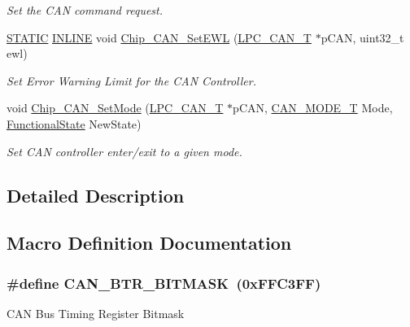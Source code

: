 \begin{DoxyCompactItemize}
\begin{DoxyCompactList}\small\item\em Set the C\+AN command request. \end{DoxyCompactList}\item 
\hyperlink{group__LPC__Types__Public__Macros_ga10b2d890d871e1489bb02b7e70d9bdfb}{S\+T\+A\+T\+IC} \hyperlink{group__LPC__Types__Public__Types_ga2eb6f9e0395b47b8d5e3eeae4fe0c116}{I\+N\+L\+I\+NE} void \hyperlink{group__CAN__17XX__40XX_ga70f13e4a2f4cd74d56e14b0c6343c8df}{Chip\+\_\+\+C\+A\+N\+\_\+\+Set\+E\+WL} (\hyperlink{structLPC__CAN__T}{L\+P\+C\+\_\+\+C\+A\+N\+\_\+T} $\ast$p\+C\+AN, uint32\+\_\+t ewl)
\begin{DoxyCompactList}\small\item\em Set Error Warning Limit for the C\+AN Controller. \end{DoxyCompactList}\item 
void \hyperlink{group__CAN__17XX__40XX_gad935e9c3c93278bb18b99df67ba52516}{Chip\+\_\+\+C\+A\+N\+\_\+\+Set\+Mode} (\hyperlink{structLPC__CAN__T}{L\+P\+C\+\_\+\+C\+A\+N\+\_\+T} $\ast$p\+C\+AN, \hyperlink{group__CAN__17XX__40XX_ga57c03b9f9b4ebf86dccc13baf8c2889c}{C\+A\+N\+\_\+\+M\+O\+D\+E\+\_\+T} Mode, \hyperlink{group__LPC__Types__Public__Types_gac9a7e9a35d2513ec15c3b537aaa4fba1}{Functional\+State} New\+State)
\begin{DoxyCompactList}\small\item\em Set C\+AN controller enter/exit to a given mode. \end{DoxyCompactList}\end{DoxyCompactItemize}


\subsection{Detailed Description}


\subsection{Macro Definition Documentation}
\subsubsection[{\texorpdfstring{C\+A\+N\+\_\+\+B\+T\+R\+\_\+\+B\+I\+T\+M\+A\+SK}{CAN_BTR_BITMASK}}]{\setlength{\rightskip}{0pt plus 5cm}\#define C\+A\+N\+\_\+\+B\+T\+R\+\_\+\+B\+I\+T\+M\+A\+SK~(0x\+F\+F\+C3\+F\+F)}\hypertarget{group__CAN__17XX__40XX_ga4e724f70048e25e40f190539157751e5}{}\label{group__CAN__17XX__40XX_ga4e724f70048e25e40f190539157751e5}
C\+AN Bus Timing Register Bitmask 

